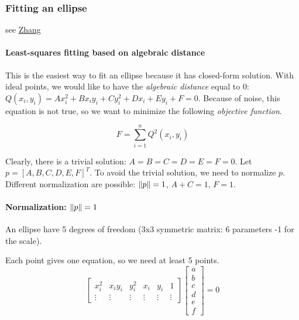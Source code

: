 \subsubsection{Fitting an ellipse}
see \href{https://members.loria.fr/MOBerger/Enseignement/Master2/Documents/ZhangIVC-97-01.pdf}{Zhang}

\paragraph{Least-squares fitting based on algebraic distance}

This is the easiest way to fit an ellipse because it has closed-form solution. With ideal points, we would like to have the \textit{algebraic distance} equal to 0: $Q(x_i, y_i) =  Ax_i^2 + Bx_iy_i + Cy_i^2 + Dx_i + Ey_i + F = 0$.
Because of noise, this equation is not true, so we want to minimize the following \textit{objective function}.

\begin{equation}
    F = \sum_{i=1}^{n} Q^2(x_i, y_i)
\end{equation}

Clearly, there is a trivial solution: $A=B=C=D=E=F=0$. Let $p = [A, B, C, D, E, F]^T$. To avoid the trivial solution, we need to normalize $p$. Different normalization are possible: $\left\lVert p\right\rVert = 1$, $A + C = 1$, $F = 1$.

\paragraph{Normalization: $\left\lVert p\right\rVert=1$}

An ellipse have 5 degrees of freedom (3x3 symmetric matrix: 6 parameters -1 for the scale).

Each point gives one equation, so we need at least 5 points.
\begin{equation}
    \left[
    \begin{array}{cccccc}
    x_i^2 & x_i y_i & y_i^2 & x_i & y_i & 1  \\
    \vdots &\vdots &\vdots &\vdots &\vdots &\vdots 
    \end{array}
    \right]
    \left[\begin{array}{c}
        a \\ b \\ c \\ d \\ e \\ f
    \end{array} \right]
    = 0
\end{equation}

